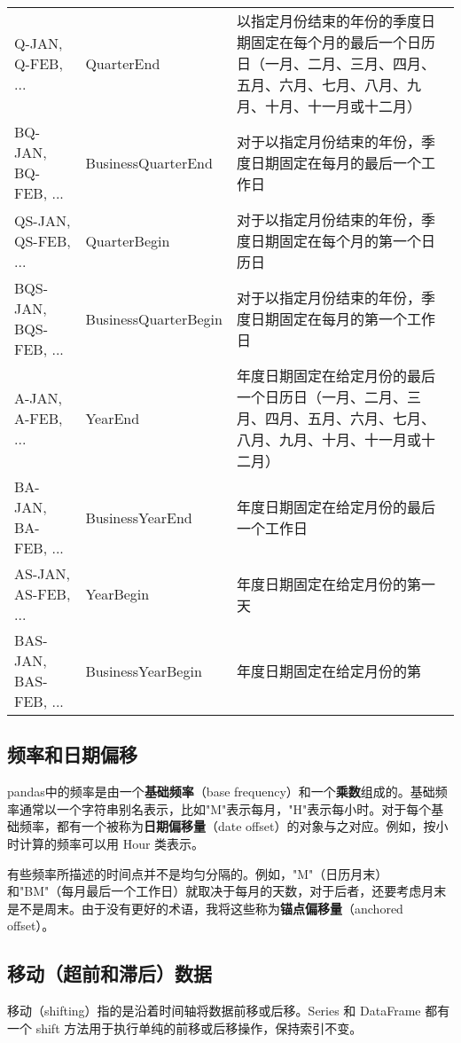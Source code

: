 \begin{table}
\begin{tabularx}{\textwidth}{llX}
        Q-JAN, Q-FEB, ...       & QuarterEnd           & 以指定月份结束的年份的季度日期固定在每个月的最后一个日历日（一月、二月、三月、四月、五月、六月、七月、八月、九月、十月、十一月或十二月） \\
        BQ-JAN, BQ-FEB, ...     & BusinessQuarterEnd   & 对于以指定月份结束的年份，季度日期固定在每月的最后一个工作日                                       \\
        QS-JAN, QS-FEB, ...     & QuarterBegin         & 对于以指定月份结束的年份，季度日期固定在每个月的第一个日历日                                       \\
        BQS-JAN, BQS-FEB, ...   & BusinessQuarterBegin & 对于以指定月份结束的年份，季度日期固定在每月的第一个工作日                                        \\
        A-JAN, A-FEB, ...       & YearEnd              & 年度日期固定在给定月份的最后一个日历日（一月、二月、三月、四月、五月、六月、七月、八月、九月、十月、十一月或十二月）           \\
        BA-JAN, BA-FEB, ...     & BusinessYearEnd      & 年度日期固定在给定月份的最后一个工作日                                                  \\
        AS-JAN, AS-FEB, ...     & YearBegin            & 年度日期固定在给定月份的第一天                                                      \\
        BAS-JAN, BAS-FEB, ...   & BusinessYearBegin    & 年度日期固定在给定月份的第                                                        \\
        \hline
    \end{tabularx}
\end{table}
\subsection{频率和日期偏移}
pandas中的频率是由一个\textbf{基础频率}（base frequency）和一个\textbf{乘数}组成的。基础频率通常以一个字符串别名表示，比如"M"表示每月，"H"表示每小时。对于每个基础频率，都有一个被称为\textbf{日期偏移量}（date offset）的对象与之对应。例如，按小时计算的频率可以用 Hour 类表示。

有些频率所描述的时间点并不是均匀分隔的。例如，"M"（日历月末）和"BM"（每月最后一个工作日）就取决于每月的天数，对于后者，还要考虑月末是不是周末。由于没有更好的术语，我将这些称为\textbf{锚点偏移量}（anchored offset）。

\subsection{移动（超前和滞后）数据}
移动（shifting）指的是沿着时间轴将数据前移或后移。Series 和 DataFrame 都有一个 shift 方法用于执行单纯的前移或后移操作，保持索引不变。

